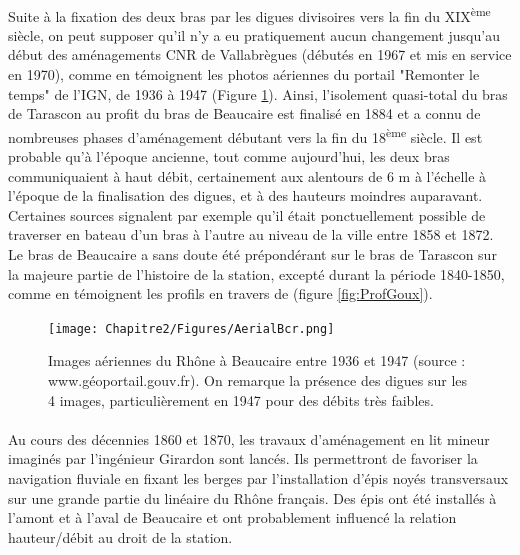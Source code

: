 \FloatBarrier
        \paragraph{} Suite à la fixation des deux bras par les digues divisoires vers la fin du XIX\textsuperscript{ème} siècle, on peut supposer qu'il n'y a eu pratiquement aucun changement jusqu'au début des aménagements CNR de Vallabrègues (débutés en 1967 et mis en service en 1970), comme en témoignent les photos aériennes du portail "Remonter le temps" de l'IGN, de 1936 à 1947 (Figure \ref{fig:AerialBcr}). Ainsi, l'isolement quasi-total du bras de Tarascon au profit du bras de Beaucaire est finalisé en 1884 et a connu de nombreuses phases d'aménagement débutant vers la fin du 18\textsuperscript{ème} siècle. Il est probable qu'à l'époque ancienne, tout comme aujourd'hui, les deux bras communiquaient à haut débit, certainement aux alentours de 6 m à l'échelle à l'époque de la finalisation des digues, et à des hauteurs moindres auparavant. Certaines sources signalent par exemple qu'il était ponctuellement possible de traverser en bateau d'un bras à l'autre au niveau de la ville entre 1858 et 1872. Le bras de Beaucaire a sans doute été prépondérant sur le bras de Tarascon sur la majeure partie de l'histoire de la station, excepté durant la période 1840-1850, comme en témoignent les profils en travers de \citet{goux_modification_1851} (figure \ref{fig:ProfGoux}).
    
        \begin{figure}[h]
            \centering
        	\texttt{[image: Chapitre2/Figures/AerialBcr.png]}
            \caption{Images aériennes du Rhône à Beaucaire entre 1936 et 1947 (source : www.géoportail.gouv.fr). On remarque la présence des digues sur les 4 images, particulièrement en 1947 pour des débits très faibles.}
            \label{fig:AerialBcr}
        \end{figure}
    
		\paragraph{} Au cours des décennies 1860 et 1870, les travaux d'aménagement en lit mineur imaginés par l'ingénieur Girardon sont lancés. Ils permettront de favoriser la navigation fluviale en fixant les berges par l'installation d'épis noyés transversaux sur une grande partie du linéaire du Rhône français. Des épis ont été installés à l'amont et à l'aval de Beaucaire et ont probablement influencé la relation hauteur/débit au droit de la station.
    
